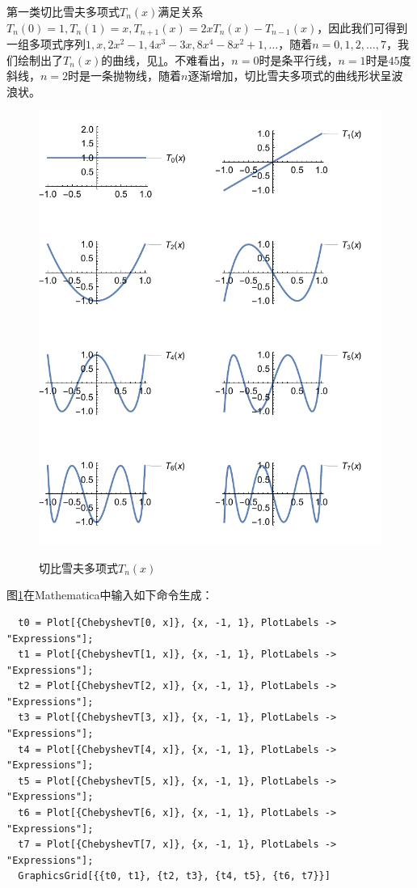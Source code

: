 第一类切比雪夫多项式$T_n(x)$满足关系$T_n(0)=1, T_n(1)=x, T_{n+1}(x) = 2x T_n(x) - T_{n-1}(x)$，因此我们可得到一组多项式序列$1, x, 2x^2-1, 4x^3 - 3x, 8x^4 - 8x^2 + 1, \ldots$，随着$n=0,1,2,\ldots,7$，我们绘制出了$T_n(x)$的曲线，见\ref{fig:pj-spectral-chebyshev}。不难看出，$n=0$时是条平行线，$n=1$时是$45$度斜线，$n=2$时是一条抛物线，随着$n$逐渐增加，切比雪夫多项式的曲线形状呈波浪状。
\begin{figure}[htbp]
   \caption{切比雪夫多项式$T_n(x)$}
  \centering
  \includegraphics[width=15cm]{./Figures/20170917-chebyshev-poly}
  \label{fig:pj-spectral-chebyshev}
%
\end{figure}

图\ref{fig:pj-spectral-chebyshev}在Mathematica中输入如下命令生成：
\begin{verbatim}
  t0 = Plot[{ChebyshevT[0, x]}, {x, -1, 1}, PlotLabels -> "Expressions"];
  t1 = Plot[{ChebyshevT[1, x]}, {x, -1, 1}, PlotLabels -> "Expressions"];
  t2 = Plot[{ChebyshevT[2, x]}, {x, -1, 1}, PlotLabels -> "Expressions"];
  t3 = Plot[{ChebyshevT[3, x]}, {x, -1, 1}, PlotLabels -> "Expressions"];
  t4 = Plot[{ChebyshevT[4, x]}, {x, -1, 1}, PlotLabels -> "Expressions"];
  t5 = Plot[{ChebyshevT[5, x]}, {x, -1, 1}, PlotLabels -> "Expressions"];
  t6 = Plot[{ChebyshevT[6, x]}, {x, -1, 1}, PlotLabels -> "Expressions"];
  t7 = Plot[{ChebyshevT[7, x]}, {x, -1, 1}, PlotLabels -> "Expressions"];
  GraphicsGrid[{{t0, t1}, {t2, t3}, {t4, t5}, {t6, t7}}]
\end{verbatim}


